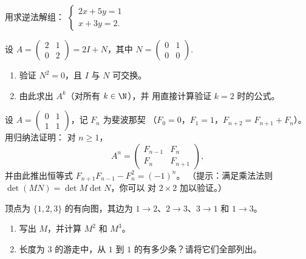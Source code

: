 \begin{exercise}[$\star$]\label{exo:g12:matrix:3}
用求逆法解组：
$\begin{cases} 2x + 5y = 1\\ x + 3y = 2 . \end{cases}$
\end{exercise}

\begin{exercise}[$\star\star$]\label{exo:g12:matrix:4}
设 $A = \begin{pmatrix} 2 & 1\\ 0 & 2\end{pmatrix} = 2I + N$，其中
$N = \begin{pmatrix} 0 & 1\\ 0 & 0 \end{pmatrix}$.
\begin{enumerate}
  \item 验证 $N^2 = 0$，且 $I$ 与 $N$ 可交换。
  \item 由此求出 $A^k$（对所有 $k \in \N$），并
        用直接计算验证 $k=2$ 时的公式。
\end{enumerate}
\end{exercise}

\begin{exercise}[$\star\star$]\label{exo:g12:matrix:5}
设 $A = \begin{pmatrix} 0 & 1\\ 1 & 1\end{pmatrix}$，记 $F_n$ 为斐波那契
（$F_0 = 0$，$F_1 = 1$，$F_{n+2} = F_{n+1} + F_n$）。用归纳法证明：
对 $n \geq 1$，
\[
A^n = \begin{pmatrix} F_{n-1} & F_n\\ F_n & F_{n+1}\end{pmatrix},
\]
并由此推出恒等式 $F_{n+1}F_{n-1} - F_n^2 = (-1)^n$。
（提示：满足乘法法则 $\det(MN) = \det M \det N$，你可以
对 $2\times2$ 加以验证。）
\end{exercise}

\begin{exercise}[$\star\star$]\label{exo:g12:matrix:6}
顶点为 $\{1, 2, 3\}$ 的有向图，其边为
$1\to2$、$2\to3$、$3\to1$ 和 $1\to3$。
\begin{enumerate}
  \item 写出 $M$，并计算 $M^2$ 和 $M^3$。
  \item 长度为 $3$ 的游走中，从 $1$ 到 $1$ 的有多少条？请将它们全部列出。
\end{enumerate}
\end{exercise}

